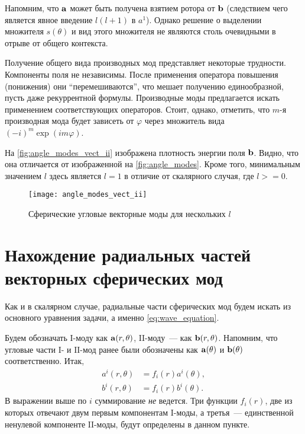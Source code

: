 \documentclass[12pt,a4paper]{article}
\begin{document}
        Напомним, что $\vb{a}$ может быть получена взятием ротора от $\vb{b}$ (следствием чего является явное введение $l(l+1)$ в $a^1$). Однако решение о выделении множителя $s(\theta)$ и вид этого множителя не являются столь очевидными в отрыве от общего контекста.

        Получение общего вида производных мод представляет некоторые трудности. Компоненты поля не независимы. После применения оператора повышения (понижения) они \enquote{перемешиваются}, что мешает получению единообразной, пусть даже рекуррентной формулы. Производные моды предлагается искать применением соответствующих операторов. Стоит, однако, отметить, что $m$-я производная мода будет зависеть от $\varphi$ через множитель вида $(-i)^m \exp(i m \varphi)$.

        На \autoref{fig:angle_modes_vect_ii} изображена плотность энергии поля $\vb{b}$. Видно, что она отличается от изображенной на \autoref{fig:angle_modes}. Кроме того, минимальным значением $l$ здесь является $l = 1$ в отличие от скалярного случая, где $l >= 0$.
        \begin{figure}[h]
            \centering
            \texttt{[image: angle\_modes\_vect\_ii]}
            \caption[]{Сферические угловые векторные моды для нескольких $l$}
            \label{fig:angle_modes_vect_ii}
        \end{figure}


    \section{Нахождение радиальных частей векторных сферических мод}

        Как и в скалярном случае, радиальные части сферических мод будем искать из основного уравнения задачи, а именно \autoref{eq:wave_equation}.

        Будем обозначать $\mathrm{I}$-моду как $\vb{a}(r,\theta)$, $\mathrm{II}$-моду~--- как $\vb{b}(r,\theta)$. Напомним, что угловые части $\mathrm{I}$- и $\mathrm{II}$-мод ранее были обозначены как $\vb{a}(\theta)$ и $\vb{b}(\theta)$ соответственно. Итак,
        \begin{equation}\begin{aligned}\label{eq:generic_vector_modes}
            a^i(r,\theta) &= f_i(r) a^i(\theta), \\
            b^i(r,\theta) &= f_i(r) b^i(\theta).
        \end{aligned}\end{equation}
        В выражении выше по $i$ суммирование \textit{не} ведется. Три функции $f_i(r)$, две из которых отвечают двум первым компонентам $\mathrm{I}$-моды, а третья~--- единственной ненулевой компоненте $\mathrm{II}$-моды, будут определены в данном пункте.
\end{document}
